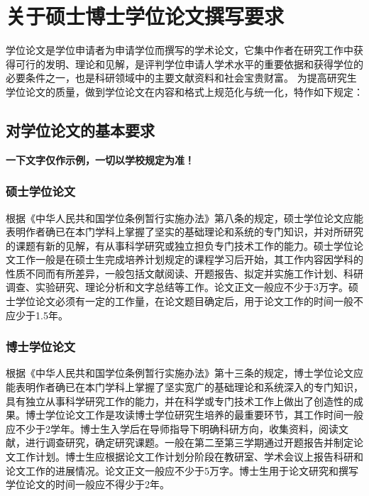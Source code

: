 ﻿\iffalse

\chapter{关于硕士博士学位论文撰写要求}
\label{chap:requires}

学位论文是学位申请者为申请学位而撰写的学术论文，它集中作者在研究工作中获得可行的发明、理论和见解，是评判学位申请人学术水平的重要依据和获得学位的必要条件之一，也是科研领域中的主要文献资料和社会宝贵财富。
为提高研究生学位论文的质量，做到学位论文在内容和格式上规范化与统一化，特作如下规定：

\section{对学位论文的基本要求}

\textbf{一下文字仅作示例，一切以学校规定为准！}

\subsection{硕士学位论文}

根据《中华人民共和国学位条例暂行实施办法》第八条的规定，硕士学位论文应能表明作者确已在本门学科上掌握了坚实的基础理论和系统的专门知识，并对所研究的课题有新的见解，有从事科学研究或独立担负专门技术工作的能力。硕士学位论文工作一般是在硕士生完成培养计划规定的课程学习后开始，其工作内容因学科的性质不同而有所差异，一般包括文献阅读、开题报告、拟定并实施工作计划、科研调查、实验研究、理论分析和文字总结等工作。论文正文一般应不少于3万字。硕士学位论文必须有一定的工作量，在论文题目确定后，用于论文工作的时间一般不应少于1.5年。

\subsection{博士学位论文}

根据《中华人民共和国学位条例暂行实施办法》第十三条的规定，博士学位论文应能表明作者确已在本门学科上掌握了坚实宽广的基础理论和系统深入的专门知识，具有独立从事科学研究工作的能力，并在科学或专门技术工作上做出了创造性的成果。博士学位论文工作是攻读博士学位研究生培养的最重要环节，其工作时间一般应不少于2学年。博士生入学后在导师指导下明确科研方向，收集资料，阅读文献，进行调查研究，确定研究课题。一般在第二至第三学期通过开题报告并制定论文工作计划。博士生应根据论文工作计划分阶段在教研室、学术会议上报告科研和论文工作的进展情况。论文正文一般应不少于5万字。博士生用于论文研究和撰写学位论文的时间一般应不得少于2年。

